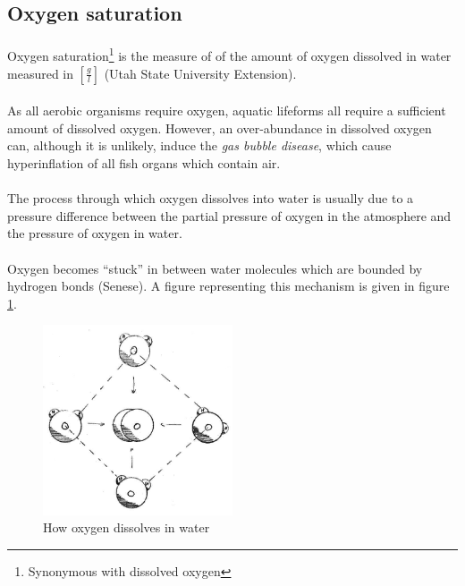 \documentclass[a4paper]{article}
\begin{document}
\subsection{Oxygen saturation}

\paragraph*{}
Oxygen saturation\footnote{Synonymous with dissolved oxygen} is the measure of
of the amount of oxygen dissolved in water measured in $\left[
\frac{\si{g}}{\si{l}} \right]$ (Utah State University Extension).

\paragraph*{}
As all aerobic organisms require oxygen, aquatic lifeforms all require a
sufficient amount of dissolved oxygen. However, an over-abundance in dissolved
oxygen can, although it is unlikely, induce the \textit{gas bubble disease},
which cause hyperinflation of all fish organs which contain air.

\paragraph*{}
The process through which oxygen dissolves into water is usually due to a
pressure difference between the partial pressure of oxygen in the atmosphere
and the pressure of oxygen in water.

\paragraph*{}
Oxygen becomes ``stuck'' in between water molecules which are bounded by
hydrogen bonds (Senese). A figure representing this mechanism is given in
figure \ref{fig:do}.

\begin{figure}[ht]
  \centering
  \includegraphics[width=0.5\textwidth]{img/do}
  \caption{How oxygen dissolves in water}
  \label{fig:do}
\end{figure}
\end{document}

